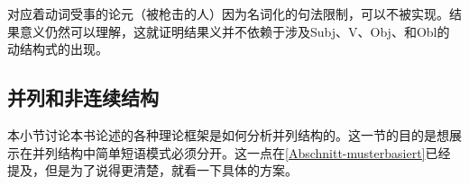 \begin{exe}
\begin{xlist}[iv.]
\begin{exe}
\begin{xlist}[iv.]
\zl
对应着动词受事的论元（被枪击的人）因为名词化的句法限制，可以不被实现。结果意义仍然可以理解，这就证明结果义并不依赖于涉及Subj、V、Obj、和Obl的动结构式的出现。

\subsection{并列和非连续结构}
\label{Abschnitt-Koordination}
\label{Abschnitt-Koordination-diskont}\label{sec-coordination-cg}

本小节讨论本书论述的各种理论框架是如何分析并列结构的。这一节的目的是想展示在并列结构中简单短语模式必须分开。这一点在\ref{Abschnitt-musterbasiert}已经提及，但是为了说得更清楚，就看一下具体的方案。


\end{xlist}
\end{exe}
\end{xlist}
\end{exe}
